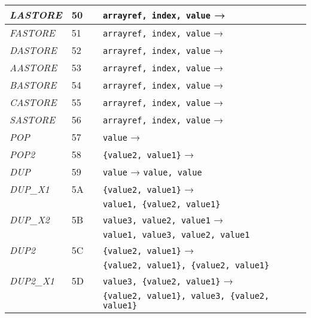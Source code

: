 \begin{center}
\begin{longtable}{ | p{} | p{} | p{} | p{} | }
        \emph{LASTORE}
		& 50 & & \lstinline|arrayref, index, value| →
		\\ \hline

        \emph{FASTORE}
		& 51 & & \lstinline|arrayref, index, value| →
		\\ \hline

        \emph{DASTORE}
		& 52 & & \lstinline|arrayref, index, value| →
		\\ \hline

        \emph{AASTORE}
		& 53 & & \lstinline|arrayref, index, value| →
		\\ \hline

        \emph{BASTORE}
		& 54 & & \lstinline|arrayref, index, value| →
		\\ \hline

        \emph{CASTORE}
		& 55 & & \lstinline|arrayref, index, value| →
		\\ \hline

        \emph{SASTORE}
		& 56 & & \lstinline|arrayref, index, value| →
		\\ \hline

        \emph{POP}
		& 57 & & \lstinline|value| →
		\\ \hline

        \emph{POP2}
		& 58 & & \lstinline|{value2, value1}| →
		\\ \hline

        \emph{DUP}
		& 59 & & \lstinline|value| → \lstinline|value, value|
		\\ \hline

        \emph{DUP\_X1}
		& 5A & & \lstinline|{value2, value1}| → \\
        & & & \lstinline|value1, {value2, value1}|
		\\ \hline

        \emph{DUP\_X2}
		& 5B & & \lstinline|value3, value2, value1| → \\
        & & & \lstinline|value1, value3, value2, value1|
		\\ \hline

        \emph{DUP2}
		& 5C & & \lstinline|{value2, value1}| → \\
        & & & \lstinline|{value2, value1}, {value2, value1}|
		\\ \hline

        \emph{DUP2\_X1}
		& 5D & & \lstinline|value3, {value2, value1}| → \\
        & & & \lstinline|{value2, value1}, value3, {value2, value1}|
		\\ \hline


\end{longtable}
\end{center}
